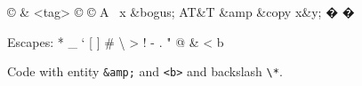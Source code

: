 © \& \textless tag\textgreater{} © © A ~x \&bogus; AT\&T \&amp \&copy
x\&y; � �

Escapes: * \_ ` {[} {]} \# \textbackslash{} \textgreater{} ! - . "
\textquotesingle{} @ \& \textless{} b

Code with entity \texttt{\&amp;} and \texttt{\textless{}b\textgreater{}}
and backslash \texttt{\textbackslash{}*}.
